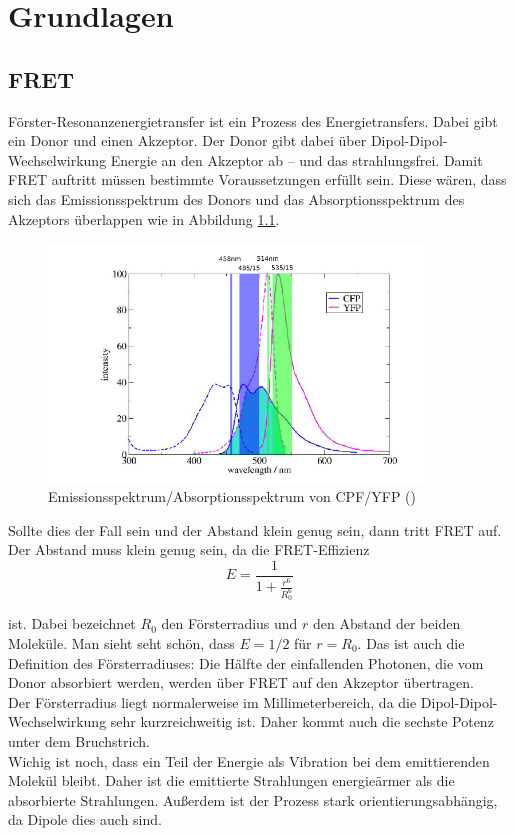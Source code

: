 
\chapter{Grundlagen}

\section{FRET}

Förster-Resonanzenergietransfer ist ein Prozess des Energietransfers. Dabei gibt ein Donor und einen Akzeptor. Der Donor gibt dabei über Dipol-Dipol-Wechselwirkung 
Energie an den Akzeptor ab – und das strahlungsfrei.
Damit FRET auftritt müssen bestimmte Voraussetzungen erfüllt sein. Diese wären, dass sich das Emissionsspektrum des Donors und das Absorptionsspektrum des Akzeptors überlappen wie in  
Abbildung \ref{bild:FRETSpektrum}.

\begin{figure}[h]
    \centering
    \includegraphics[width = 10cm]{Bilder/Grundlagen/FRETSpektrum.png}
    \caption{Emissionsspektrum/Absorptionsspektrum von CPF/YFP (\cite{FRETSkript})}
    \label{bild:FRETSpektrum}
\end{figure}

Sollte dies der Fall sein und der Abstand klein genug sein, dann tritt FRET auf. \\
Der Abstand muss klein genug sein, da die FRET-Effizienz\\


\begin{equation}
    E = \frac{1}{1+\frac{r^6}{R_0^6}}
\end{equation}

ist. Dabei bezeichnet $R_0$ den Försterradius und $r$ den Abstand der beiden Moleküle. Man sieht seht schön, dass $E = 1/2$ für $r = R_0$. Das ist auch die 
Definition des Försterradiuses: Die Hälfte der einfallenden Photonen, die vom Donor absorbiert werden, werden über FRET auf den Akzeptor übertragen.\\
Der Försterradius liegt normalerweise im Millimeterbereich, da die Dipol-Dipol-Wechselwirkung sehr kurzreichweitig ist. Daher kommt auch die sechste Potenz unter dem Bruchstrich.\\
Wichig ist noch, dass ein Teil der Energie als Vibration bei dem emittierenden Molekül bleibt. Daher ist die emittierte Strahlungen energieärmer als die absorbierte Strahlungen. Außerdem 
ist der Prozess stark orientierungsabhängig, da Dipole dies auch sind.



